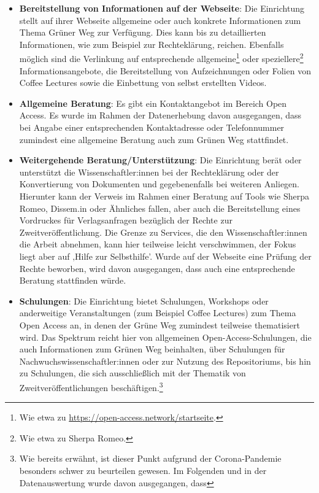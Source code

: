 \documentclass[a4paper,
fontsize=11pt,
oneside,
numbers=noperiodatend,
parskip=half-,
bibliography=totoc,
final
]{scrartcl}
\begin{document}
\begin{itemize}
\item
  \textbf{Bereitstellung von Informationen auf der Webseite}: Die
  Einrichtung stellt auf ihrer Webseite allgemeine oder auch konkrete
  Informationen zum Thema Grüner Weg zur Verfügung. Dies kann bis zu
  detaillierten Informationen, wie zum Beispiel zur Rechteklärung,
  reichen. Ebenfalls möglich sind die Verlinkung auf entsprechende
  allgemeine\footnote{Wie etwa zu
    \url{https://open-access.network/startseite}.} oder
  speziellere\footnote{Wie etwa zu Sherpa Romeo.} Informationsangebote,
  die Bereitstellung von Aufzeichnungen oder Folien von Coffee Lectures
  sowie die Einbettung von selbst erstellten Videos.
\item
  \textbf{Allgemeine Beratung}: Es gibt ein Kontaktangebot im Bereich
  Open Access. Es wurde im Rahmen der Datenerhebung davon ausgegangen,
  dass bei Angabe einer entsprechenden Kontaktadresse oder Telefonnummer
  zumindest eine allgemeine Beratung auch zum Grünen Weg stattfindet.
\item
  \textbf{Weitergehende Beratung/Unterstützung}: Die Einrichtung berät
  oder unterstützt die Wissenschaftler:innen bei der Rechteklärung oder
  der Konvertierung von Dokumenten und gegebenenfalls bei weiteren
  Anliegen. Hierunter kann der Verweis im Rahmen einer Beratung auf
  Tools wie Sherpa Romeo, Dissem.in oder Ähnliches fallen, aber auch die
  Bereitstellung eines Vordruckes für Verlagsanfragen bezüglich der
  Rechte zur Zweitveröffentlichung. Die Grenze zu Services, die den
  Wissenschaftler:innen die Arbeit abnehmen, kann hier teilweise leicht
  verschwimmen, der Fokus liegt aber auf ‚Hilfe zur Selbsthilfe'. Wurde
  auf der Webseite eine Prüfung der Rechte beworben, wird davon
  ausgegangen, dass auch eine entsprechende Beratung stattfinden würde.
\item
  \textbf{Schulungen}: Die Einrichtung bietet Schulungen, Workshops oder
  anderweitige Veranstaltungen (zum Beispiel Coffee Lectures) zum Thema
  Open Access an, in denen der Grüne Weg zumindest teilweise
  thematisiert wird. Das Spektrum reicht hier von allgemeinen
  Open-Access-Schulungen, die auch Informationen zum Grünen Weg
  beinhalten, über Schulungen für Nachwuchswissenschaftler:innen oder
  zur Nutzung des Repositoriums, bis hin zu Schulungen, die sich
  ausschließlich mit der Thematik von Zweitveröffentlichungen
  beschäftigen.\footnote{Wie bereits erwähnt, ist dieser Punkt aufgrund
    der Corona-Pandemie besonders schwer zu beurteilen gewesen. Im
    Folgenden und in der Datenauswertung wurde davon ausgegangen, dass
}
\end{itemize}
\end{document}
